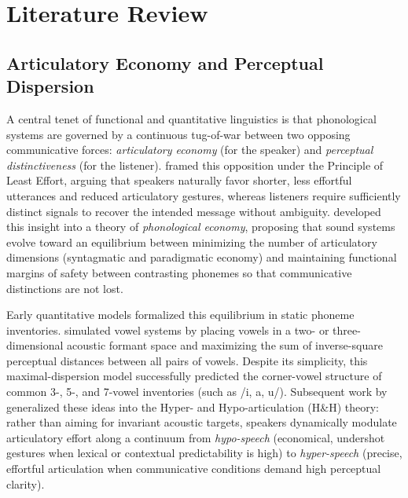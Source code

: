 \documentclass[cm]{glossa}
\begin{document}
\section{Literature Review}
\subsection{Articulatory Economy and Perceptual Dispersion}
A central tenet of functional and quantitative linguistics is that phonological systems are governed by a continuous tug-of-war between two opposing communicative forces: \emph{articulatory economy} (for the speaker) and \emph{perceptual distinctiveness} (for the listener). \citet{zipf1949} framed this opposition under the Principle of Least Effort, arguing that speakers naturally favor shorter, less effortful utterances and reduced articulatory gestures, whereas listeners require sufficiently distinct signals to recover the intended message without ambiguity. \citet{martinet1955} developed this insight into a theory of \emph{phonological economy}, proposing that sound systems evolve toward an equilibrium between minimizing the number of articulatory dimensions (syntagmatic and paradigmatic economy) and maintaining functional margins of safety between contrasting phonemes so that communicative distinctions are not lost.

Early quantitative models formalized this equilibrium in static phoneme inventories. \citet{liljencrants1972} simulated vowel systems by placing vowels in a two- or three-dimensional acoustic formant space and maximizing the sum of inverse-square perceptual distances between all pairs of vowels. Despite its simplicity, this maximal-dispersion model successfully predicted the corner-vowel structure of common \mbox{3-}, \mbox{5-}, and \mbox{7-vowel} inventories (such as /i, a, u/). Subsequent work by \citet{lindblom1990} generalized these ideas into the Hyper- and Hypo-articulation (H\&H) theory: rather than aiming for invariant acoustic targets, speakers dynamically modulate articulatory effort along a continuum from \emph{hypo-speech} (economical, undershot gestures when lexical or contextual predictability is high) to \emph{hyper-speech} (precise, effortful articulation when communicative conditions demand high perceptual clarity).
\end{document}
